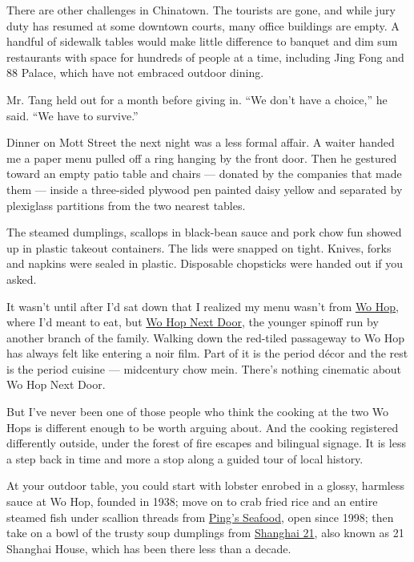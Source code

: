 There are other challenges in Chinatown. The tourists are gone, and
while jury duty has resumed at some downtown courts, many office
buildings are empty. A handful of sidewalk tables would make little
difference to banquet and dim sum restaurants with space for hundreds of
people at a time, including Jing Fong and 88 Palace, which have not
embraced outdoor dining.

Mr. Tang held out for a month before giving in. ``We don't have a
choice,'' he said. ``We have to survive.''

Dinner on Mott Street the next night was a less formal affair. A waiter
handed me a paper menu pulled off a ring hanging by the front door. Then
he gestured toward an empty patio table and chairs --- donated by the
companies that made them --- inside a three-sided plywood pen painted
daisy yellow and separated by plexiglass partitions from the two nearest
tables.

The steamed dumplings, scallops in black-bean sauce and pork chow fun
showed up in plastic takeout containers. The lids were snapped on tight.
Knives, forks and napkins were sealed in plastic. Disposable chopsticks
were handed out if you asked.

It wasn't until after I'd sat down that I realized my menu wasn't from
\href{https://www.wohop17.com/}{Wo Hop}, where I'd meant to eat, but
\href{https://www.wohop15.com/menu}{Wo Hop Next Door}, the younger
spinoff run by another branch of the family. Walking down the red-tiled
passageway to Wo Hop has always felt like entering a noir film. Part of
it is the period décor and the rest is the period cuisine --- midcentury
chow mein. There's nothing cinematic about Wo Hop Next Door.

But I've never been one of those people who think the cooking at the two
Wo Hops is different enough to be worth arguing about. And the cooking
registered differently outside, under the forest of fire escapes and
bilingual signage. It is less a step back in time and more a stop along
a guided tour of local history.

At your outdoor table, you could start with lobster enrobed in a glossy,
harmless sauce at Wo Hop, founded in 1938; move on to crab fried rice
and an entire steamed fish under scallion threads from
\href{https://www.nytimes3xbfgragh.onion/2000/08/09/dining/restaurants-diners-and-dinner-exchanging-glances.html?searchResultPosition=1}{Ping's
Seafood}, open since 1998; then take on a bowl of the trusty soup
dumplings from \href{https://shanghai21togo.com/\#}{Shanghai 21}, also
known as 21 Shanghai House, which has been there less than a decade.

